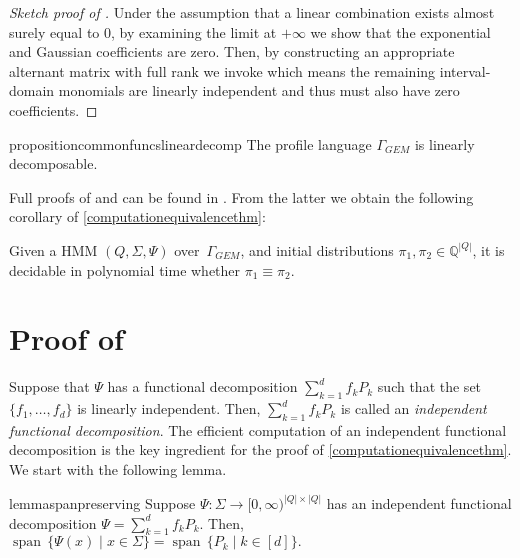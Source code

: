 \documentclass[a4paper,UKenglish,cleveref, autoref,mathscr, amsthm, thmtools, thm-restate]{lipics-v2019}
\newcommand{\QQ}{\mathbb{Q}}
\newcommand{\1}{\mathbb{I}}
\newcommand{\pl}{\Gamma_{\mathit{GEM}}}
\DeclareMathOperator{\Span}{span\,}
\begin{document}
\begin{proof}[Sketch proof of ]
Under the assumption that a linear combination exists almost surely equal to $0$, by examining the limit at $+\infty$ we show that the exponential and Gaussian coefficients are zero. Then, by constructing an appropriate alternant matrix with full rank we invoke  which means the remaining interval-domain monomials are linearly independent and thus must also have zero coefficients.
\end{proof}

\begin{restatable}{proposition}{commonfuncslineardecomp}\label{commonfuncslineardecomp}
The profile language $\pl$ is linearly decomposable.
\end{restatable} 
Full proofs of  and  can be found in \cite{darkief20tech}. From the latter we obtain the following corollary of \cref{computationequivalencethm}:
\begin{corollary}
Given a HMM $(Q, \Sigma, \Psi)$ over~$\pl$, and initial distributions $\pi_1, \pi_2 \in \QQ^{|Q|}$, it is decidable in polynomial time whether $\pi_1 \equiv \pi_2$.
\end{corollary}




\section{Proof of }\label{starredsec}

Suppose that $\Psi$ has a functional decomposition $\sum_{k = 1}^d f_k P_k$ such that the set $\{f_1, \dots, f_d\}$ is linearly independent. Then, $\sum_{k = 1}^d f_k P_k$ is called an \emph{independent functional decomposition}.
The efficient computation of an independent functional decomposition is the key ingredient for the proof of \cref{computationequivalencethm}. 
We start with the following lemma.

\begin{restatable}{lemma}{spanpreserving}\label{spanpreserving}
Suppose $\Psi : \Sigma \rightarrow [0,\infty)^{|Q| \times |Q|}$ has an independent functional decomposition $\Psi = \sum_{k = 1}^d f_k P_k$. Then, $\Span \{\Psi(x) \mid x \in \Sigma\} = \Span \{P_k \mid k \in [d]\}.$
\end{restatable}
\end{document}
